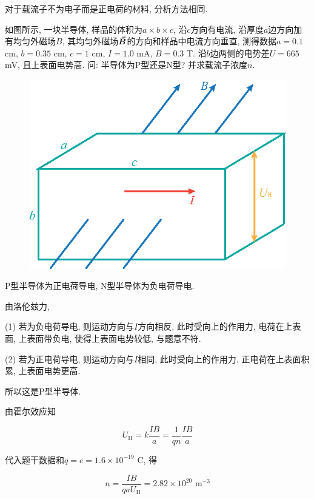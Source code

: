 对于载流子不为电子而是正电荷的材料, 分析方法相同. 

\begin{example}
	如图所示, 一块半导体, 样品的体积为$a \times b \times c$, 沿$c$方向有电流, 沿厚度$a$边方向加有均匀外磁场$B$, 其均匀外磁场$\va*{B}$的方向和样品中电流方向垂直, 测得数据$a = 0.1$ cm, $b = 0.35$ cm, $c = 1$ cm, $I = 1.0$ mA, $B = 0.3$ T. 沿$b$边两侧的电势差$U = 665$ mV, 且上表面电势高. 问: 半导体为P型还是N型? 并求载流子浓度$n$.
	
	\begin{figure}[H]
		\centering
		\includegraphics[scale=0.7]{C8-fig13.eps}
	\end{figure}
	
	\begin{solution}
		
		P型半导体为正电荷导电, N型半导体为负电荷导电. 
		
		由洛伦兹力, 
		
		(1) 若为负电荷导电, 则运动方向与$I$方向相反, 此时受向上的作用力, 电荷在上表面, 上表面带负电, 使得上表面电势较低, 与题意不符. 
		
		(2) 若为正电荷导电, 则运动方向与$I$相同, 此时受向上的作用力. 正电荷在上表面积累, 上表面电势更高. 
		
		所以这是P型半导体. 
		
		由霍尔效应知
		
		\begin{equation*}
			U_{\textrm{H}} = k \dfrac{IB}{a} = \dfrac{1}{qn} \dfrac{IB}{a}
		\end{equation*}
		
		代入题干数据和$q = e = 1.6 \times 10^{-19}$ C, 得
		
		\begin{equation*}
			n = \dfrac{IB}{q a U_{\textrm{H}}} = 2.82 \times 10^{20} \textrm{~m}^{-3}
		\end{equation*}
		
	\end{solution}
	
\end{example}

